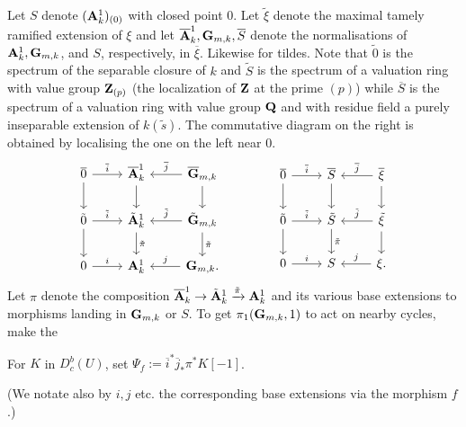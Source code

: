 \documentclass[deligne.tex]{subfiles}
\begin{document}
Let $S$ denote $(\mathbf{A}^1_k)_{(0)}$ with closed point $0$.
Let $\tilde\xi$ denote the maximal tamely ramified extension of $\xi$ and
let $\overline{\mathbf{A}}^1_k,\mathbf{G}_{m,k},\overline S$ denote the normalisations of
$\mathbf{A}^1_k,\mathbf{G}_{m,k}$, and $S$, respectively, in $\overline\xi$.
Likewise for tildes.
Note that $\tilde 0$ is the spectrum of the separable closure of $k$
and %
$\tilde S$ is the spectrum of a valuation ring with value group
$\mathbf{Z}_{(p)}$ (the localization of $\mathbf{Z}$ at the prime $(p)$) while
$\overline S$ is the spectrum of a valuation ring with value group $\mathbf{Q}$
and with residue field a purely inseparable extension of $k(\tilde s)$.
The commutative diagram on the right is obtained by localising the one
on the left near $0$.
\begin{equation*}\begin{tikzcd}
	\overline 0\arrow[d]\arrow[r,"\overline i"]&
	\overline\A^1_k\arrow[d]&\overline\GG_{m,k}\arrow[l,"\overline j"']\arrow[d] \\
	\tilde 0\arrow[d]\arrow[r,"\tilde i"]&
	\tilde\A^1_k\arrow[d,"\tilde\pi"]&\tilde\GG_{m,k}\arrow[l,"\tilde j"']\arrow[d,"\tilde\pi"] \\
	0\arrow[r,"i"]&\A^1_k&\GG_{m,k}\arrow[l,"j"'].
\end{tikzcd}\qquad\qquad
\begin{tikzcd}
	\overline 0\arrow[d]\arrow[r,"\overline i"]&
	\overline S
	\arrow[d]&\overline\xi\arrow[l,"\overline j"']\arrow[d] \\
	\tilde 0\arrow[d]\arrow[r,"\tilde i"]&
	\tilde S\arrow[d,"\tilde\pi"]&\tilde\xi\arrow[l,"\tilde j"']\arrow[d] \\
	0\arrow[r,"i"]& S&\xi\arrow[l,"j"'].
\end{tikzcd}\end{equation*}
Let $\pi$ denote the composition
$\overline{\mathbf{A}}^1_k\rightarrow\tilde{\mathbf{A}}^1_k\xrightarrow{\tilde\pi}\mathbf{A}^1_k$ and its various base
extensions to morphisms landing in $\mathbf{G}_{m,k}$ or $S$.
To get $\pi_1(\mathbf{G}_{m,k},1)$ to act on nearby cycles, make the 
\begin{definition*}
	For $K$ in $D_c^b(U)$, set 
	$\Psi_f:=\overline i^*\overline j_*\pi^*K[-1]$.
\end{definition*}
(We notate also by $i,j$ etc. the corresponding base extensions via
the morphism $f$.)
\end{document}
